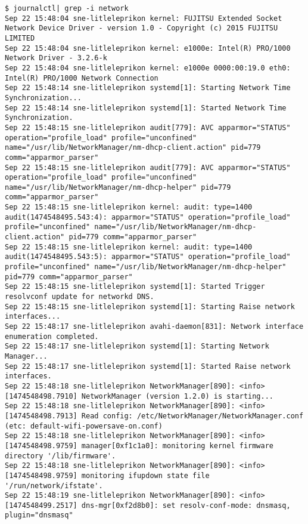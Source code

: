 \documentclass[a4paper,11pt]{article}
\theoremstyle{mytheor}
\begin{document}
\begin{lstlisting}
$ journalctl| grep -i network
Sep 22 15:48:04 sne-litleleprikon kernel: FUJITSU Extended Socket Network Device Driver - version 1.0 - Copyright (c) 2015 FUJITSU LIMITED
Sep 22 15:48:04 sne-litleleprikon kernel: e1000e: Intel(R) PRO/1000 Network Driver - 3.2.6-k
Sep 22 15:48:04 sne-litleleprikon kernel: e1000e 0000:00:19.0 eth0: Intel(R) PRO/1000 Network Connection
Sep 22 15:48:14 sne-litleleprikon systemd[1]: Starting Network Time Synchronization...
Sep 22 15:48:14 sne-litleleprikon systemd[1]: Started Network Time Synchronization.
Sep 22 15:48:15 sne-litleleprikon audit[779]: AVC apparmor="STATUS" operation="profile_load" profile="unconfined" name="/usr/lib/NetworkManager/nm-dhcp-client.action" pid=779 comm="apparmor_parser"
Sep 22 15:48:15 sne-litleleprikon audit[779]: AVC apparmor="STATUS" operation="profile_load" profile="unconfined" name="/usr/lib/NetworkManager/nm-dhcp-helper" pid=779 comm="apparmor_parser"
Sep 22 15:48:15 sne-litleleprikon kernel: audit: type=1400 audit(1474548495.543:4): apparmor="STATUS" operation="profile_load" profile="unconfined" name="/usr/lib/NetworkManager/nm-dhcp-client.action" pid=779 comm="apparmor_parser"
Sep 22 15:48:15 sne-litleleprikon kernel: audit: type=1400 audit(1474548495.543:5): apparmor="STATUS" operation="profile_load" profile="unconfined" name="/usr/lib/NetworkManager/nm-dhcp-helper" pid=779 comm="apparmor_parser"
Sep 22 15:48:15 sne-litleleprikon systemd[1]: Started Trigger resolvconf update for networkd DNS.
Sep 22 15:48:15 sne-litleleprikon systemd[1]: Starting Raise network interfaces...
Sep 22 15:48:17 sne-litleleprikon avahi-daemon[831]: Network interface enumeration completed.
Sep 22 15:48:17 sne-litleleprikon systemd[1]: Starting Network Manager...
Sep 22 15:48:17 sne-litleleprikon systemd[1]: Started Raise network interfaces.
Sep 22 15:48:18 sne-litleleprikon NetworkManager[890]: <info>  [1474548498.7910] NetworkManager (version 1.2.0) is starting...
Sep 22 15:48:18 sne-litleleprikon NetworkManager[890]: <info>  [1474548498.7913] Read config: /etc/NetworkManager/NetworkManager.conf (etc: default-wifi-powersave-on.conf)
Sep 22 15:48:18 sne-litleleprikon NetworkManager[890]: <info>  [1474548498.9759] manager[0xf1c1a0]: monitoring kernel firmware directory '/lib/firmware'.
Sep 22 15:48:18 sne-litleleprikon NetworkManager[890]: <info>  [1474548498.9759] monitoring ifupdown state file '/run/network/ifstate'.
Sep 22 15:48:19 sne-litleleprikon NetworkManager[890]: <info>  [1474548499.2517] dns-mgr[0xf2d8b0]: set resolv-conf-mode: dnsmasq, plugin="dnsmasq"

\end{lstlisting}
\end{document}
